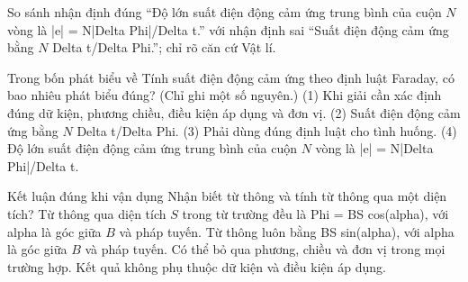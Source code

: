 \begin{bt}
So sánh nhận định đúng “Độ lớn suất điện động cảm ứng trung bình của cuộn $N$ vòng là |e| = N|Delta Phi|/Delta t.” với nhận định sai “Suất điện động cảm ứng bằng $N$ Delta t/Delta Phi.”; chỉ rõ căn cứ Vật lí.
\end{bt}

\begin{ex}
Trong bốn phát biểu về Tính suất điện động cảm ứng theo định luật Faraday, có bao nhiêu phát biểu đúng? (Chỉ ghi một số nguyên.) (1) Khi giải cần xác định đúng dữ kiện, phương chiều, điều kiện áp dụng và đơn vị. (2) Suất điện động cảm ứng bằng $N$ Delta t/Delta Phi. (3) Phải dùng đúng định luật cho tình huống. (4) Độ lớn suất điện động cảm ứng trung bình của cuộn $N$ vòng là |e| = N|Delta Phi|/Delta t.
\end{ex}

\begin{ex}
Kết luận đúng khi vận dụng Nhận biết từ thông và tính từ thông qua một diện tích?
\choice
{\True Từ thông qua diện tích $S$ trong từ trường đều là Phi = BS cos(alpha), với alpha là góc giữa $B$ và pháp tuyến.}
{Từ thông luôn bằng BS sin(alpha), với alpha là góc giữa $B$ và pháp tuyến.}
{Có thể bỏ qua phương, chiều và đơn vị trong mọi trường hợp.}
{Kết quả không phụ thuộc dữ kiện và điều kiện áp dụng.}
\end{ex}

